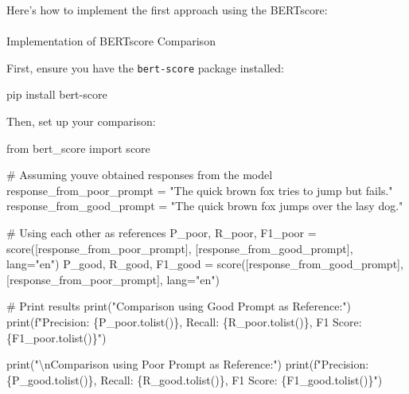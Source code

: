\documentclass[
]{agujournal2019}
\makeatletter
\let\oldparagraph\paragraph
\renewcommand{\paragraph}{
    \@ifstar
      \xxxParagraphStar
      \xxxParagraphNoStar
  }
\newcommand{\xxxParagraphStar}[1]{\oldparagraph*{#1}\mbox{}}
\newcommand{\xxxParagraphNoStar}[1]{\oldparagraph{#1}\mbox{}}
\newenvironment{Shaded}{\begin{snugshade}}{\end{snugshade}}
\newcommand{\BuiltInTok}[1]{\textcolor[rgb]{0.00,0.23,0.31}{#1}}
\newcommand{\CharTok}[1]{\textcolor[rgb]{0.13,0.47,0.30}{#1}}
\newcommand{\CommentTok}[1]{\textcolor[rgb]{0.37,0.37,0.37}{#1}}
\newcommand{\ExtensionTok}[1]{\textcolor[rgb]{0.00,0.23,0.31}{#1}}
\newcommand{\ImportTok}[1]{\textcolor[rgb]{0.00,0.46,0.62}{#1}}
\newcommand{\NormalTok}[1]{\textcolor[rgb]{0.00,0.23,0.31}{#1}}
\newcommand{\OperatorTok}[1]{\textcolor[rgb]{0.37,0.37,0.37}{#1}}
\newcommand{\SpecialCharTok}[1]{\textcolor[rgb]{0.37,0.37,0.37}{#1}}
\newcommand{\SpecialStringTok}[1]{\textcolor[rgb]{0.13,0.47,0.30}{#1}}
\newcommand{\StringTok}[1]{\textcolor[rgb]{0.13,0.47,0.30}{#1}}
\makeatother
\begin{document}
Here's how to implement the first approach using the BERTscore:

\paragraph{Implementation of BERTscore
Comparison}\label{implementation-of-bertscore-comparison}

First, ensure you have the \texttt{bert-score} package installed:

\begin{Shaded}
\begin{Highlighting}[]
\ExtensionTok{pip}\NormalTok{ install bert{-}score}
\end{Highlighting}
\end{Shaded}

Then, set up your comparison:

\begin{Shaded}
\begin{Highlighting}[]
\ImportTok{from}\NormalTok{ bert\_score }\ImportTok{import}\NormalTok{ score}

\CommentTok{\# Assuming you\textquotesingle{}ve obtained responses from the model}
\NormalTok{response\_from\_poor\_prompt }\OperatorTok{=} \StringTok{"The quick brown fox tries to jump but fails."}
\NormalTok{response\_from\_good\_prompt }\OperatorTok{=} \StringTok{"The quick brown fox jumps over the lasy dog."}

\CommentTok{\# Using each other as references}
\NormalTok{P\_poor, R\_poor, F1\_poor }\OperatorTok{=}\NormalTok{ score([response\_from\_poor\_prompt], [response\_from\_good\_prompt], lang}\OperatorTok{=}\StringTok{"en"}\NormalTok{)}
\NormalTok{P\_good, R\_good, F1\_good }\OperatorTok{=}\NormalTok{ score([response\_from\_good\_prompt], [response\_from\_poor\_prompt], lang}\OperatorTok{=}\StringTok{"en"}\NormalTok{)}

\CommentTok{\# Print results}
\BuiltInTok{print}\NormalTok{(}\StringTok{"Comparison using Good Prompt as Reference:"}\NormalTok{)}
\BuiltInTok{print}\NormalTok{(}\SpecialStringTok{f"Precision: }\SpecialCharTok{\{}\NormalTok{P\_poor}\SpecialCharTok{.}\NormalTok{tolist()}\SpecialCharTok{\}}\SpecialStringTok{, Recall: }\SpecialCharTok{\{}\NormalTok{R\_poor}\SpecialCharTok{.}\NormalTok{tolist()}\SpecialCharTok{\}}\SpecialStringTok{, F1 Score: }\SpecialCharTok{\{}\NormalTok{F1\_poor}\SpecialCharTok{.}\NormalTok{tolist()}\SpecialCharTok{\}}\SpecialStringTok{"}\NormalTok{)}

\BuiltInTok{print}\NormalTok{(}\StringTok{"}\CharTok{\textbackslash{}n}\StringTok{Comparison using Poor Prompt as Reference:"}\NormalTok{)}
\BuiltInTok{print}\NormalTok{(}\SpecialStringTok{f"Precision: }\SpecialCharTok{\{}\NormalTok{P\_good}\SpecialCharTok{.}\NormalTok{tolist()}\SpecialCharTok{\}}\SpecialStringTok{, Recall: }\SpecialCharTok{\{}\NormalTok{R\_good}\SpecialCharTok{.}\NormalTok{tolist()}\SpecialCharTok{\}}\SpecialStringTok{, F1 Score: }\SpecialCharTok{\{}\NormalTok{F1\_good}\SpecialCharTok{.}\NormalTok{tolist()}\SpecialCharTok{\}}\SpecialStringTok{"}\NormalTok{)}
\end{Highlighting}
\end{Shaded}
\end{document}
